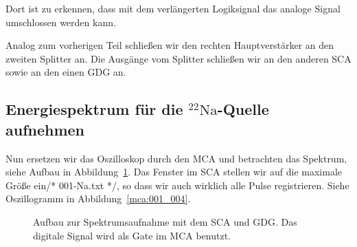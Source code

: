 Dort ist zu erkennen, dass mit dem verlängerten Logiksignal das analoge Signal
umschlossen werden kann.

Analog zum vorherigen Teil schließen wir den rechten Hauptverstärker an den
zweiten Splitter an. Die Ausgänge vom Splitter schließen wir an den anderen SCA
sowie an den einen GDG an.

\subsection{Energiespektrum für die ${}^{22}\mathrm{Na}$-Quelle aufnehmen}

Nun ersetzen wir das Oszilloskop durch den MCA und betrachten das Spektrum,
siehe Aufbau in Abbildung~\ref{fig:aufbau:sca_gdg_mca}. Das Fenster im SCA
stellen wir auf die maximale Größe ein/* 001-Na.txt */, so dass wir auch
wirklich alle Pulse registrieren. Siehe Oszillogramm in
Abbildung~\ref{mca:001_004}.

\begin{figure}[htbp]
    \centering
    \caption{%
        Aufbau zur Spektrumsaufnahme mit dem SCA und GDG. Das digitale Signal
        wird als Gate im MCA benutzt.
    }
    \label{fig:aufbau:sca_gdg_mca}
\end{figure}

